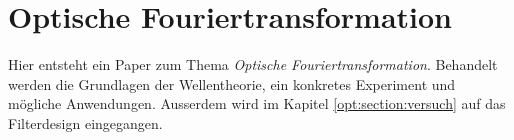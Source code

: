%
%
%
%

\newcommand{\opttodo}[1] {\textbf{\textcolor{red}{TODO: #1}}}
\newcommand{\optrh}{\opttodo{REF HERE}}

\chapter{Optische Fouriertransformation\label{chapter:opt}}
\begin{refsection}

Hier entsteht ein Paper zum Thema \emph{Optische Fouriertransformation}. Behandelt werden die Grundlagen der
Wellentheorie, ein konkretes Experiment und mögliche Anwendungen. Ausserdem wird im
Kapitel \ref{opt:section:versuch} auf das Filterdesign eingegangen.






\printbibliography[heading=subbibliography]
\end{refsection}
